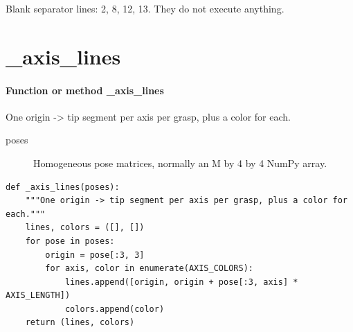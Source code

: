 \documentclass[11pt,a4paper]{book}
\begin{document}
Blank separator lines: 2, 8, 12, 13. They do not execute anything.

\section{\_axis\_lines}

\paragraph{Function or method \_axis\_lines}
One origin -> tip segment per axis per grasp, plus a color for each.

\begin{description}
\item[poses] Homogeneous pose matrices, normally an M by 4 by 4 NumPy array.
\end{description}

\begin{lstlisting}[firstnumber=14]
def _axis_lines(poses):
    """One origin -> tip segment per axis per grasp, plus a color for each."""
    lines, colors = ([], [])
    for pose in poses:
        origin = pose[:3, 3]
        for axis, color in enumerate(AXIS_COLORS):
            lines.append([origin, origin + pose[:3, axis] * AXIS_LENGTH])
            colors.append(color)
    return (lines, colors)


\end{lstlisting}
\end{document}
